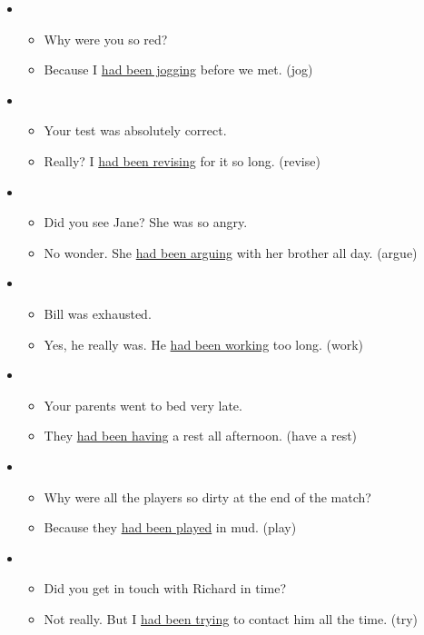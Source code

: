 \begin{itemize}

\item
\begin{itemize}
\item Why were you so red?
\item Because I \underline{had been jogging} before we met. (jog)
\end{itemize}

\item
\begin{itemize}
\item Your test was absolutely correct.
\item Really? I \underline{had been revising} for it so long. (revise)
\end{itemize}

\item
\begin{itemize}
\item Did you see Jane? She was so angry.
\item No wonder. She \underline{had been arguing} with her brother all day. (argue)
\end{itemize}

\item
\begin{itemize}
\item Bill was exhausted.
\item Yes, he really was. He \underline{had been working} too long. (work)
\end{itemize}

\item
\begin{itemize}
\item Your parents went to bed very late.
\item They \underline{had been having} a rest all afternoon. (have a rest)
\end{itemize}

\item
\begin{itemize}
\item Why were all the players so dirty at the end of the match?
\item Because they \underline{had been played} in mud. (play)
\end{itemize}

\item
\begin{itemize}
\item Did you get in touch with Richard in time?
\item Not really. But I \underline{had been trying} to contact him all the time. (try)
\end{itemize}


\end{itemize}
